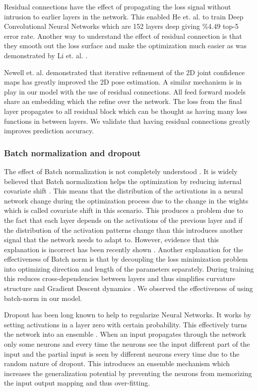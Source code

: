Residual connections have the effect of propagating the loss signal without intrusion to earlier layers in the network. This enabled He et. al. \parencite{he2016deep} to train Deep Convolutional Neural Networks which are  152 layers deep giving \%4.49 top-5 error rate. Another way to understand the effect of residual connection is that they smooth out the loss surface and make the optimization much easier as was demonstrated by Li et. al. \parencite{li2017visualizing}.

Newell et. al. \parencite{newell2016stacked} demonstrated that iterative refinement of the 2D joint confidence maps has greatly improved the 2D pose estimation. A similar mechanism is in play in our model with the use of residual connections. All feed forward models share an embedding which the refine over the network. The loss from the final layer propagates to all residual block which can be thought as having many loss functions in between layers. We validate that having residual connections greatly improves prediction accuracy.   

\subsubsection{Batch normalization and dropout}

The effect of Batch normalization \parencite{ioffe2015batch} is not completely understood \parencite{kohler2018towards}. It is widely believed that Batch normalization helps the optimization by reducing internal covariate shift \parencite{ioffe2015batch}. This means that the distribution of the activations in a neural network change during the optimization process due to the change in the wights which is called covariate shift in this scenario. This produces a problem due to the fact that each layer depends on the activations of the previous layer and if the distribution of the activation patterns change than this introduces another signal that the network needs to adapt to. However, evidence that this explanation is incorrect has been recently shown \parencite{santurkar2018does}. Another explanation for the effectiveness of Batch norm is that by decoupling the loss minimization problem into optimizing direction and length of the parameters separately. During training this reduces cross-dependencies between layers and thus simplifies curvature structure and Gradient Descent dynamics \parencite{kohler2018towards}. We observed the effectiveness of using batch-norm in our model.

Dropout \parencite{srivastava2014dropout} has been long known to help to regularize Neural Networks. It works by setting activations in a layer zero with certain probability. This effectively turns the network into an ensemble \parencite{hara2016analysis}. When an input propagates through the network only some neurons and every time the neurons see the input different part of the input and the partial input is seen by different neurons every time due to the random nature of dropout. This introduces an ensemble mechanism which increases the generalization potential by preventing the neurons from memorizing the input output mapping and thus over-fitting. 

